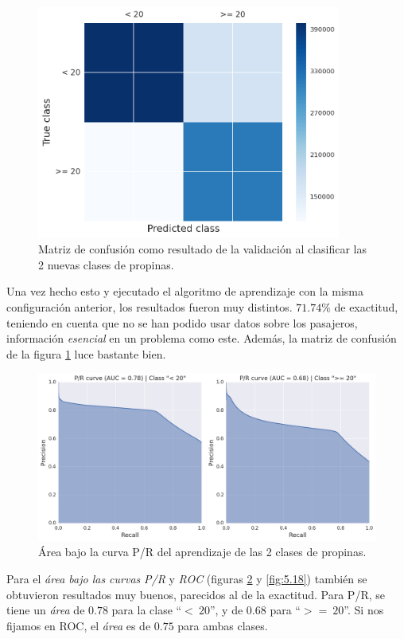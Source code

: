 \begin{figure}[H]
  \centering
  \includegraphics[width=100mm]{figures/ch_05/confusion_matrix_2.png}
  \caption{Matriz de confusión como resultado de la validación al clasificar las 2 nuevas clases de propinas.}
  \label{fig:5.16}
\end{figure}

Una vez hecho esto y ejecutado el algoritmo de aprendizaje con la misma configuración anterior, los resultados fueron muy distintos. $\mathbf{71.74\%}$ de exactitud, teniendo en cuenta que no se han podido usar datos sobre los pasajeros, información \emph{esencial} en un problema como este. Además, la matriz de confusión de la figura \ref{fig:5.16} luce bastante bien.

\begin{figure}[H]
  \centering
  \includegraphics[width=136mm]{figures/ch_05/pr_auc.png}
  \caption{Área bajo la curva P/R del aprendizaje de las 2 clases de propinas.}
  \label{fig:5.17}
\end{figure}

Para el \emph{área bajo las curvas} \emph{P/R} y \emph{ROC} (figuras \ref{fig:5.17} y \ref{fig:5.18}) también se obtuvieron resultados muy buenos, parecidos al de la exactitud. Para P/R, se tiene un \emph{área} de $0.78$ para la clase ``$<\:20$'', y de $0.68$ para ``$>=\:20$''. Si nos fijamos en ROC, el \emph{área} es de $0.75$ para ambas clases.

